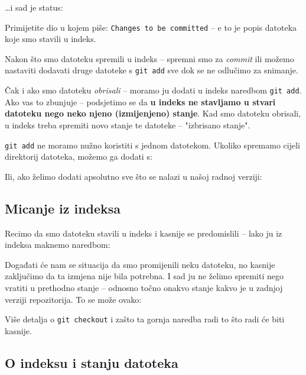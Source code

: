 \dots{}i sad je status:



Primijetite dio u kojem piše: \verb+Changes to be committed+ -- e to je popis datoteka koje smo stavili u indeks.

Nakon što smo datoteku spremili u indeks -- spremni smo za \emph{commit} ili možemo nastaviti dodavati druge datoteke s \verb+git add+ sve dok se ne odlučimo za snimanje.

Čak i ako smo datoteku \emph{obrisali} -- moramo ju dodati u indeks naredbom \verb+git add+.
Ako vas to zbunjuje -- podsjetimo se da \textbf{u indeks ne stavljamo u stvari datoteku nego neko njeno (izmijenjeno) stanje}.
Kad smo datoteku obrisali, u indeks treba spremiti novo stanje te datoteke -- "izbrisano stanje".

\verb+git add+ ne moramo nužno koristiti s jednom datotekom.
Ukoliko spremamo cijeli direktorij datoteka, možemo ga dodati s:


Ili, ako želimo dodati apsolutno sve što se nalazi u našoj radnoj verziji:


\subsection*{Micanje iz indeksa}

Recimo da smo datoteku stavili u indeks i kasnije se predomislili -- lako ju iz indeksa maknemo naredbom:


Događati će nam se situacija da smo promijenili neku datoteku, no kasnije zaključimo da ta izmjena nije bila potrebna. 
I sad ju ne želimo spremiti nego vratiti u prethodno stanje -- odnosno točno onakvo stanje kakvo je u zadnjoj verziji repozitorija.
To se može ovako:


Više detalja o \verb+git checkout+ i zašto ta gornja naredba radi to što radi će biti kasnije.

\subsection*{O indeksu i stanju datoteka}

